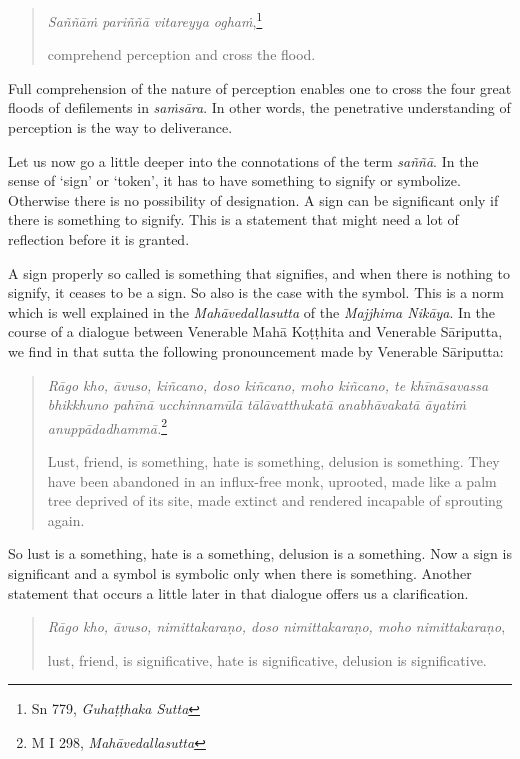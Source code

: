 \begin{quote}
\emph{Saññāṁ pariññā vitareyya oghaṁ},\footnote{Sn 779, \emph{Guhaṭṭhaka Sutta}}

comprehend perception and cross the flood.
\end{quote}

Full comprehension of the nature of perception enables one to cross the four great floods of defilements in \emph{saṁsāra}. In other words, the penetrative understanding of perception is the way to deliverance.

Let us now go a little deeper into the connotations of the term \emph{saññā}. In the sense of `sign' or `token', it has to have something to signify or symbolize. Otherwise there is no possibility of designation. A sign can be significant only if there is something to signify. This is a statement that might need a lot of reflection before it is granted.

A sign properly so called is something that signifies, and when there is nothing to signify, it ceases to be a sign. So also is the case with the symbol. This is a norm which is well explained in the \emph{Mahāvedallasutta} of the \emph{Majjhima Nikāya}. In the course of a dialogue between Venerable Mahā Koṭṭhita and Venerable Sāriputta, we find in that sutta the following pronouncement made by Venerable Sāriputta:

\begin{quote}
\emph{Rāgo kho, āvuso, kiñcano, doso kiñcano, moho kiñcano, te khīnāsavassa bhikkhuno pahīnā ucchinnamūlā tālāvatthukatā anabhāvakatā āyatiṁ anuppādadhammā.}\footnote{M I 298, \emph{Mahāvedallasutta}}

Lust, friend, is something, hate is something, delusion is something. They have been abandoned in an influx-free monk, uprooted, made like a palm tree deprived of its site, made extinct and rendered incapable of sprouting again.
\end{quote}

So lust is a something, hate is a something, delusion is a something. Now a sign is significant and a symbol is symbolic only when there is something. Another statement that occurs a little later in that dialogue offers us a clarification.

\begin{quote}
\emph{Rāgo kho, āvuso, nimittakaraṇo, doso nimittakaraṇo, moho nimittakaraṇo},

lust, friend, is significative, hate is significative, delusion is significative.
\end{quote}

